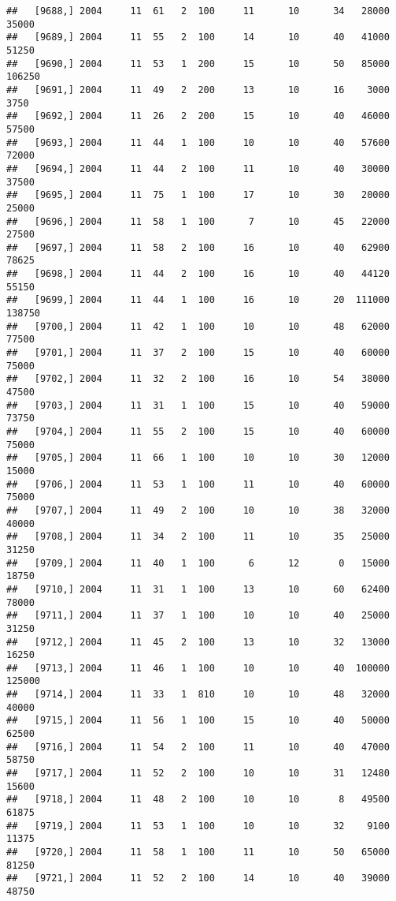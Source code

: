 \documentclass{article}\usepackage[]{graphicx}\usepackage[]{color}
\makeatletter
\newenvironment{kframe}{%
 \def\at@end@of@kframe{}%
 \ifinner\ifhmode%
  \def\at@end@of@kframe{\end{minipage}}%
  \begin{minipage}{\columnwidth}%
 \fi\fi%
 \def\FrameCommand##1{\hskip\@totalleftmargin \hskip-\fboxsep
 \colorbox{shadecolor}{##1}\hskip-\fboxsep
     \hskip-\linewidth \hskip-\@totalleftmargin \hskip\columnwidth}%
 \MakeFramed {\advance\hsize-\width
   \@totalleftmargin\z@ \linewidth\hsize
   \@setminipage}}%
 {\par\unskip\endMakeFramed%
 \at@end@of@kframe}
\newenvironment{knitrout}{}{} %
\makeatother
\begin{document}
\begin{knitrout}
\begin{kframe}
\begin{verbatim}
##   [9688,] 2004     11  61   2  100     11      10      34   28000   35000
##   [9689,] 2004     11  55   2  100     14      10      40   41000   51250
##   [9690,] 2004     11  53   1  200     15      10      50   85000  106250
##   [9691,] 2004     11  49   2  200     13      10      16    3000    3750
##   [9692,] 2004     11  26   2  200     15      10      40   46000   57500
##   [9693,] 2004     11  44   1  100     10      10      40   57600   72000
##   [9694,] 2004     11  44   2  100     11      10      40   30000   37500
##   [9695,] 2004     11  75   1  100     17      10      30   20000   25000
##   [9696,] 2004     11  58   1  100      7      10      45   22000   27500
##   [9697,] 2004     11  58   2  100     16      10      40   62900   78625
##   [9698,] 2004     11  44   2  100     16      10      40   44120   55150
##   [9699,] 2004     11  44   1  100     16      10      20  111000  138750
##   [9700,] 2004     11  42   1  100     10      10      48   62000   77500
##   [9701,] 2004     11  37   2  100     15      10      40   60000   75000
##   [9702,] 2004     11  32   2  100     16      10      54   38000   47500
##   [9703,] 2004     11  31   1  100     15      10      40   59000   73750
##   [9704,] 2004     11  55   2  100     15      10      40   60000   75000
##   [9705,] 2004     11  66   1  100     10      10      30   12000   15000
##   [9706,] 2004     11  53   1  100     11      10      40   60000   75000
##   [9707,] 2004     11  49   2  100     10      10      38   32000   40000
##   [9708,] 2004     11  34   2  100     11      10      35   25000   31250
##   [9709,] 2004     11  40   1  100      6      12       0   15000   18750
##   [9710,] 2004     11  31   1  100     13      10      60   62400   78000
##   [9711,] 2004     11  37   1  100     10      10      40   25000   31250
##   [9712,] 2004     11  45   2  100     13      10      32   13000   16250
##   [9713,] 2004     11  46   1  100     10      10      40  100000  125000
##   [9714,] 2004     11  33   1  810     10      10      48   32000   40000
##   [9715,] 2004     11  56   1  100     15      10      40   50000   62500
##   [9716,] 2004     11  54   2  100     11      10      40   47000   58750
##   [9717,] 2004     11  52   2  100     10      10      31   12480   15600
##   [9718,] 2004     11  48   2  100     10      10       8   49500   61875
##   [9719,] 2004     11  53   1  100     10      10      32    9100   11375
##   [9720,] 2004     11  58   1  100     11      10      50   65000   81250
##   [9721,] 2004     11  52   2  100     14      10      40   39000   48750

\end{verbatim}
\end{kframe}
\end{knitrout}
\end{document}
